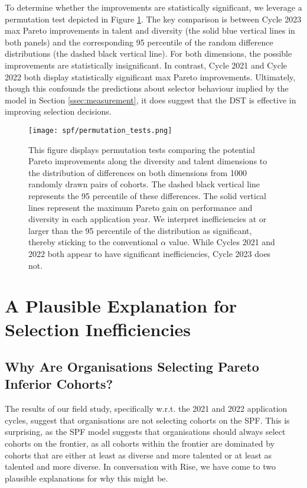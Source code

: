 To determine whether the improvements are statistically significant, we leverage a permutation test depicted in Figure \ref{fig:permutation_tests}. The key comparison is between Cycle 2023 max Pareto improvements in talent and diversity (the solid blue vertical lines in both panels) and the corresponding 95 percentile of the random difference distributions (the dashed black vertical line). For both dimensions, the possible improvements are statistically insignificant. In contrast, Cycle 2021 and Cycle 2022 both display statistically significant max Pareto improvements. Ultimately, though this confounds the predictions about selector behaviour implied by the model in Section \ref{ssec:measurement}, it does suggest that the DST is effective in improving selection decisions.

\begin{figure}[htbp]
    \centering
    \caption{This figure displays permutation tests comparing the potential Pareto improvements along the diversity and talent dimensions to the distribution of differences on both dimensions from 1000 randomly drawn pairs of cohorts. The dashed black vertical line represents the 95 percentile of these differences. The solid vertical lines represent the maximum Pareto gain on performance and diversity in each application year. We interpret inefficiencies at or larger than the 95 percentile of the distribution as significant, thereby sticking to the conventional $\alpha$ value. While Cycles 2021 and 2022 both appear to have significant inefficiencies, Cycle 2023 does not.}
    \label{fig:permutation_tests}
    \texttt{[image: spf/permutation\_tests.png]} 
\end{figure}

\section{A Plausible Explanation for Selection Inefficiencies}\label{sec:spfexplanation}
\subsection{Why Are Organisations Selecting Pareto Inferior Cohorts?}\label{subsec:dts_nphard}
The results of our field study, specifically w.r.t. the 2021 and 2022 application cycles, suggest that organisations are not selecting cohorts on the SPF. This is surprising, as the SPF model suggests that organisations should always select cohorts on the frontier, as all cohorts within the frontier are dominated by cohorts that are either at least as diverse and more talented or at least as talented and more diverse. In conversation with Rise, we have come to two plausible explanations for why this might be.

